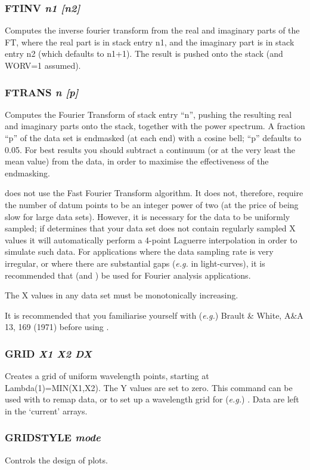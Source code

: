 \documentclass[twoside,11pt,noabs,nolof]{starlink}
\providecommand{\dipcom}[3]{\subsubsection*{\label{COM:#1}\textbf{#1} \emph{#2}}}
\begin{document}
\dipcom{FTINV}{n1 [n2]}{Takes the inverse Fourier transform of two stack entries}
Computes the inverse fourier transform from the real and imaginary
parts of the FT, where the real part is in stack entry n1, and the
imaginary part is in stack entry n2 (which defaults to n1+1). The
result is pushed onto the stack (and WORV=1 assumed).

\dipcom{FTRANS}{n [p]}{Takes the forward Fourier transform of a stack entry}
Computes the Fourier Transform of stack entry ``n'', pushing the
resulting real and imaginary parts onto the stack, together with the
power spectrum. A fraction ``p'' of the data set is endmasked (at each
end) with a cosine bell; ``p'' defaults to 0.05. For best results you
should subtract a continuum (or at the very least the mean value) from
the data, in order to maximise the effectiveness of the endmasking.

  does not use the Fast Fourier Transform algorithm. It does not,
therefore, require the number of datum points to be an integer power
of two (at the price of being slow for large data sets). However, it is
necessary for the data to be uniformly sampled; if   determines
that your data set does not contain regularly sampled X values it will
automatically perform a 4-point Laguerre interpolation in order to
simulate such data. For applications where the data sampling rate is
very irregular, or where there are substantial gaps (\emph{e.g.} in
light-curves), it is recommended that   (and )  be used
for Fourier analysis applications.

The X values in any data set must be monotonically increasing.

It is recommended that you familiarise yourself with (\emph{e.g.})
Brault \& White, A\&A 13, 169 (1971) before using .

\dipcom{GRID}{X1 X2 DX}{Creates an array of uniform wavelength values with zero Y values}
Creates a grid of uniform wavelength points, starting at
Lambda(1)=MIN(X1,X2). The Y values are set to zero. This command can
be used with   to remap data, or to set up a wavelength grid for
(\emph{e.g.}) .  Data are left in the `current' arrays.

\dipcom{GRIDSTYLE}{mode}{Controls the axes, grids and labels used to produce a plot}
Controls the design of plots.
\end{document}
